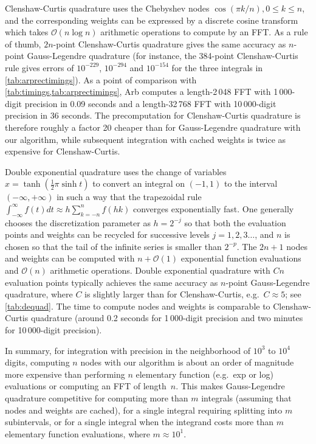 \documentclass[nohypdvips,review]{siamart0216}
\newcommand{\OO}{\mathcal{O}}
\begin{document}
Clenshaw-Curtis quadrature uses the Chebyshev nodes
$\cos(\pi k / n), 0 \le k \le n$, and the corresponding weights can be expressed
by a discrete cosine transform which takes $\OO(n \log n)$
arithmetic operations to compute by an FFT.
As a rule of thumb, $2n$-point Clenshaw-Curtis quadrature
gives the same accuracy as $n$-point Gauss-Legendre quadrature
(for instance, the 384-point Clenshaw-Curtis rule gives
errors of $10^{-229}$, $10^{-294}$ and $10^{-154}$ for the three
integrals in \cref{tab:arprectimings}).
As a point of comparison with \cref{tab:timings,tab:arprectimings},
Arb computes a length-2\,048 FFT with 1\,000-digit precision
in 0.09 seconds and a length-32\,768 FFT with 10\,000-digit precision
in 36 seconds.
The precomputation for Clenshaw-Curtis quadrature is therefore
roughly a factor 20 cheaper than for Gauss-Legendre quadrature
with our algorithm, while subsequent integration with
cached weights is twice as expensive for Clenshaw-Curtis.

Double exponential quadrature uses the change of variables
$x = \tanh(\tfrac12 \pi \sinh t)$ to convert an integral on $(-1,1)$
to the interval $(-\infty,+\infty)$ in such a way that
the trapezoidal rule $\int_{-\infty}^{\infty} f(t) dt \approx h \sum_{k=-n}^{n} f(hk)$
converges exponentially fast.
One generally chooses the discretization parameter as $h = 2^{-j}$ so that
both the evaluation points and weights can be recycled for successive levels
$j = 1, 2, 3\ldots$, and $n$ is chosen so that the tail of the
infinite series is smaller than $2^{-p}$.
The $2n+1$ nodes and weights can be computed with $n + \OO(1)$
exponential function evaluations and $\OO(n)$ arithmetic operations.
Double exponential quadrature with $Cn$ evaluation points
typically achieves the same accuracy as $n$-point Gauss-Legendre quadrature,
where $C$ is slightly larger than
for Clenshaw-Curtis, e.g.\ $C \approx 5$; see \cref{tab:dequad}.
The time to compute nodes and weights is comparable
to Clenshaw-Curtis quadrature (around 0.2 seconds for 1\,000-digit
precision and two minutes for 10\,000-digit precision).

In summary, for integration
with precision in the neighborhood of $10^3$ to $10^4$ digits,
computing $n$ nodes with our algorithm is about an
order of magnitude more expensive than performing $n$ elementary function (e.g.\ exp or log)
evaluations or computing an FFT of length~$n$.
This makes Gauss-Legendre quadrature competitive for computing more than $m$
integrals (assuming that nodes and weights are cached),
for a single integral requiring splitting into $m$ subintervals,
or for a single integral when the integrand costs more than $m$ elementary
function evaluations, where $m \approx 10^1$.
\end{document}
